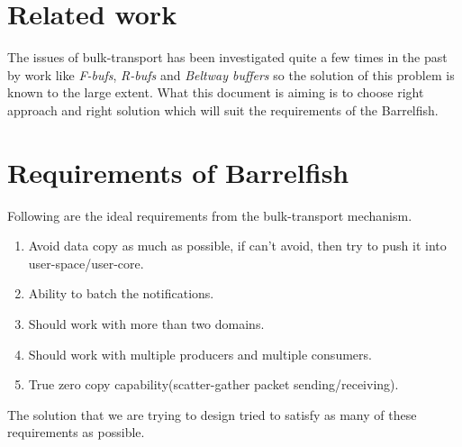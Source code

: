 \documentclass[a4paper,twoside]{report} %
\begin{document}
\section{Related work}
The issues of bulk-transport has been investigated quite a few times
in the past by work like \textit{F-bufs}, \textit{R-bufs} and
\textit{Beltway buffers} so the solution of this problem is known to 
the large extent.  What this document is aiming is to choose 
right approach and right solution which will suit the 
requirements of the Barrelfish.



\section{Requirements of Barrelfish}
Following are the ideal requirements from the bulk-transport
mechanism.
\begin{enumerate}
  \item Avoid data copy as much as possible, if can't avoid,
  then try to push it into user-space/user-core.
  \item Ability to batch the notifications.
  \item Should work with more than two domains.
  \item Should work with multiple producers and multiple consumers.
  \item True zero copy capability(scatter-gather packet
  sending/receiving).
\end{enumerate}
The solution that we are trying to design tried to satisfy as many 
of these requirements as possible.
\end{document}
